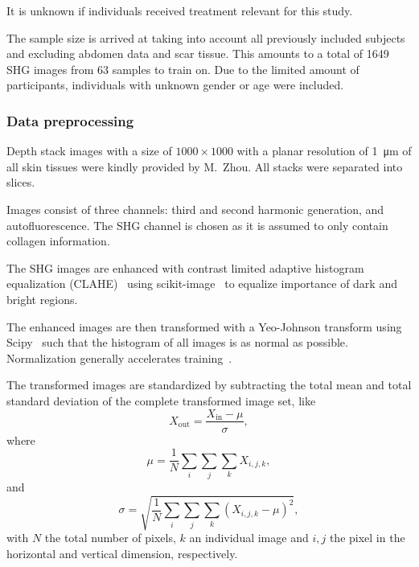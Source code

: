 It is unknown if individuals received treatment relevant for this study.

The sample size is arrived at taking into account all previously included subjects and excluding abdomen data and scar tissue.
This amounts to a total of 1649 SHG images from 63 samples to train on.
Due to the limited amount of participants, individuals with unknown gender or age were included.

\subsubsection{Data preprocessing}\label{sec:skin_data_prep}

Depth stack images with a size of $1000\times 1000$ with a planar resolution of \qty{1}{\micro\meter} of all skin tissues were kindly provided by M.\ Zhou.
All stacks were separated into slices.

Images consist of three channels: third and second harmonic generation, and autofluorescence.
The SHG channel is chosen as it is assumed to only contain collagen information.

The SHG images are enhanced with contrast limited adaptive histogram equalization (CLAHE)~ using scikit-image~ to equalize importance of dark and bright regions.

The enhanced images are then transformed with a Yeo-Johnson transform using Scipy~ such that the histogram of all images is as normal as possible.
Normalization generally accelerates training~.

The transformed images are standardized by subtracting the total mean and total standard deviation of the complete transformed image set, like
\begin{equation}
    X_\mathrm{out} = \frac{X_\mathrm{in} - \mu}{\sigma},
\end{equation}
where
\begin{equation}
    \mu = \frac{1}{N} \sum_i \sum_j \sum_k X_{i,j,k},
\end{equation}
and
\begin{equation}
    \sigma = \sqrt{\frac{1}{N} \sum_i \sum_j \sum_k \left(X_{i,j,k} - \mu\right)^2},
\end{equation}
with $N$ the total number of pixels, $k$ an individual image and $i,j$ the pixel in the horizontal and vertical dimension, respectively.

